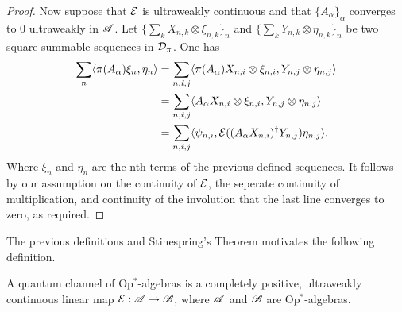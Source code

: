 \documentclass[../main.tex]{subfiles}
\begin{document}
\begin{proof}
	Now suppose that $\mathcal{E}$ is ultraweakly continuous and that $\{A_\alpha\}_\alpha$ converges to $0$ ultraweakly in $\mathscr{A}$.
	Let $\{\sum_k X_{n,k} \otimes \xi_{n, k}\}_n$ and $\{\sum_k Y_{n, k} \otimes \eta_{n, k}\}_n$
	be two square summable sequences in $\mathcal{D}_\pi$. One has
	\begin{align*}
	   	\sum_n \ip{\pi(A_\alpha)\xi_n}{\eta_n} 
		&= \sum_{n, i, j} \ip{\pi(A_\alpha)X_{n, i} \otimes \xi_{n, i}}{Y_{n, j} \otimes \eta_{n, j}} \\
		&= \sum_{n, i, j} \ip{A_\alpha X_{n,i} \otimes \xi_{n, i}}{Y_{n,j} \otimes \eta_{n,j}} \\
		&= \sum_{n, i, j} \ip{\psi_{n, i}}{\mc{E}((A_\alpha X_{n,i})^\dagger Y_{n,j})\eta_{n, j}}. \\ 
	\end{align*}
	Where $\xi_n$ and $\eta_n$ are the nth terms of the previous defined sequences.	
	It follows by our assumption on the continuity of $\mathcal{E}$, the seperate continuity of multiplication, and continuity 
	of the involution that the last line converges to zero, as required.
\end{proof}

The previous definitions and Stinespring's Theorem motivates the following definition.

\begin{definition}
	A quantum channel of Op$^*$-algebras is a completely positive, ultraweakly continuous linear map $\mathcal{E}:\mathscr{A} \to \mathscr{B}$, 
	where $\mathscr{A}$ and $\mathscr{B}$ are Op$^*$-algebras.
\end{definition}
\end{document}
